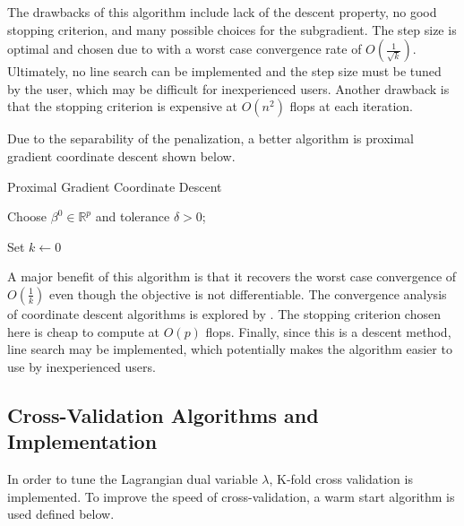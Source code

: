 \documentclass[article]{jss}
\numberwithin{equation}{section}
\newcommand{\R}{\mathbb{R}}
\begin{document}
The drawbacks of this algorithm include lack of the descent property, no good stopping criterion, and many possible choices for the subgradient.
The step size is optimal and chosen due to \cite{nesterov} with a worst case convergence rate of $O(\frac{1}{\sqrt{k}})$.
Ultimately, no line search can be implemented and the step size must be tuned by the user, which may be difficult for inexperienced users.
Another drawback is that the stopping criterion is expensive at $O(n^2)$ flops at each iteration.

Due to the separability of the penalization, a better algorithm is proximal gradient coordinate descent shown below.

\vspace{.2cm}
\begin{algorithm}[H]
\caption{Proximal Gradient Coordinate Descent}
Choose $\beta^0 \in \R^p$ and tolerance $\delta > 0$;

Set $k \gets 0$

\end{algorithm}
\vspace{.2cm}

A major benefit of this algorithm is that it recovers the worst case convergence of $O(\frac{1}{k})$ even though the objective is not differentiable. The convergence analysis of coordinate descent algorithms is explored by \cite{nesterov2}. The stopping criterion chosen here is cheap to compute at $O(p)$ flops. Finally, since this is a descent method, line search may be implemented, which potentially makes the algorithm easier to use by inexperienced users.

\subsection{Cross-Validation Algorithms and Implementation}

In order to tune the Lagrangian dual variable $\lambda$, K-fold cross validation is implemented.
To improve the speed of cross-validation, a warm start algorithm is used defined below.
\end{document}
